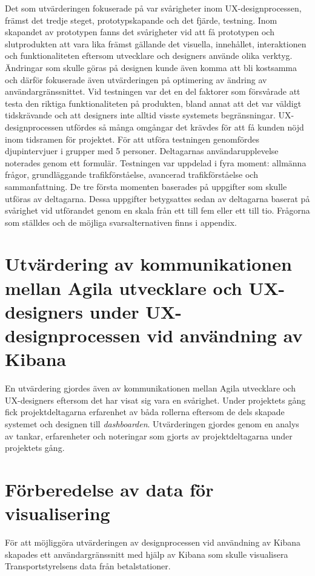 \documentclass[12pt]{kththesis}
\begin{document}
Det som utvärderingen fokuserade på var svårigheter inom UX-designprocessen, främst det tredje steget, prototypskapande och det fjärde, testning. Inom skapandet av prototypen fanns det svårigheter vid att få prototypen och slutprodukten att vara lika främst gällande det visuella, innehållet, interaktionen och funktionaliteten eftersom utvecklare och designers använde olika verktyg. Ändringar som skulle göras på designen kunde även komma att bli kostsamma och därför fokuserade även utvärderingen på optimering av ändring av användargränssnittet. Vid testningen var det en del faktorer som försvårade att testa den riktiga funktionaliteten på produkten, bland annat att det var väldigt tidskrävande och att designers inte alltid visste systemets begränsningar. UX-designprocessen utfördes så många omgångar det krävdes för att få kunden nöjd inom tidsramen för projektet. För att utföra testningen genomfördes djupintervjuer i grupper med 5 personer. Deltagarnas användarupplevelse noterades genom ett formulär. Testningen var uppdelad i fyra moment: allmänna frågor, grundläggande trafikförståelse, avancerad trafikförståelse och sammanfattning. De tre första momenten baserades på uppgifter som skulle utföras av deltagarna. Dessa uppgifter betygsattes sedan av deltagarna baserat på svårighet vid utförandet genom en skala från ett till fem eller ett till tio. Frågorna som ställdes och de möjliga svarsalternativen finns i appendix.


\section{Utvärdering av kommunikationen mellan Agila utvecklare och UX-designers under UX-designprocessen vid användning av Kibana}

En utvärdering gjordes även av kommunikationen mellan Agila utvecklare och UX-designers eftersom det har visat sig vara en svårighet. Under projektets gång fick projektdeltagarna erfarenhet av båda rollerna eftersom de dels skapade systemet och designen till \textit{dashboarden}. Utvärderingen gjordes genom en analys av tankar, erfarenheter och noteringar som gjorts av projektdeltagarna under projektets gång. 


\section{Förberedelse av data för visualisering}

För att möjliggöra utvärderingen av designprocessen vid användning av Kibana skapades ett användargränssnitt med hjälp av Kibana som skulle visualisera Transportstyrelsens data från betalstationer.
\end{document}
